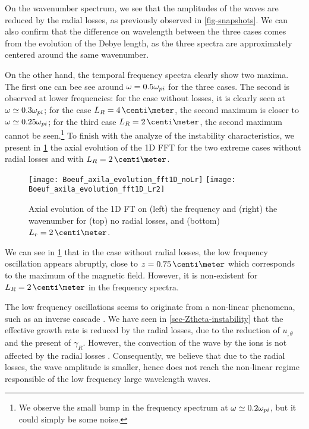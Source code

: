 On the wavenumber spectrum, we see that the amplitudes of the waves are reduced by the radial losses, as previously observed in \cref{fig-snapshots}.
We can also confirm that the difference on wavelength between the three cases comes from the evolution of the Debye length, as the three spectra are approximately centered around the same wavenumber.

On the other hand, the temporal frequency spectra clearly show two maxima. 
The first one can bee see around $\omega = 0.5 \omega_{pi}$ for the three cases.
The second is observed at lower frequencies\string: for the case without losses, it is clearly seen at  $\omega \simeq 0.3 \omega_{pi}$\string; for the case $L_R=4\,\centi\meter$, the second maximum is closer to $\omega \simeq 0.25 \omega_{pi}$\string; for the third case $L_R=2\,\centi\meter$, the second maximum cannot be seen.\footnote{We observe the small bump in the frequency spectrum at $\omega \simeq 0.2 \omega_{pi}$, but it could simply be some noise. }
To finish with the analyze of the instability characteristics, we present in \cref{fig-axial_fft1D} the axial evolution of the \ac{1D} \ac{FFT} for the two extreme cases without radial losses and with $L_R=2\,\centi\meter$.
 
\begin{figure}[!hbt]
  \centering
  \texttt{[image: Boeuf\_axila\_evolution\_fft1D\_noLr]}
  \texttt{[image: Boeuf\_axila\_evolution\_fft1D\_Lr2]}
  \caption{Axial evolution of the \ac{1D} \ac{FT} on (left) the frequency and (right) the wavenumber for (top) no radial losses, and (bottom) $L_r=2\,\centi\meter$. }
  \label{fig-axial_fft1D}
\end{figure}

We can see in \cref{fig-axial_fft1D} that in the case without radial losses, the low frequency oscillation appears abruptly, close to $z=0.75\,\centi\meter$ which corresponds to the maximum of the magnetic field.
However, it is non-existent for $L_R=2\,\centi\meter$ in the frequency spectra.


The low frequency oscillations seems to originate from a non-linear phenomena, such as an inverse cascade \citep{taccogna2019}.
We have seen in \cref{sec-Ztheta-instability} that the effective growth rate is reduced by the radial losses, due to the reduction of $u_{, \theta}$ and the present of $\gamma_R$.
However, the convection of the wave by the ions is not affected by the radial losses \citep{martorelli2019}.
Consequently, we believe that due to the radial losses, the wave amplitude is smaller, hence does not reach the non-linear regime responsible of the low frequency large wavelength waves.

